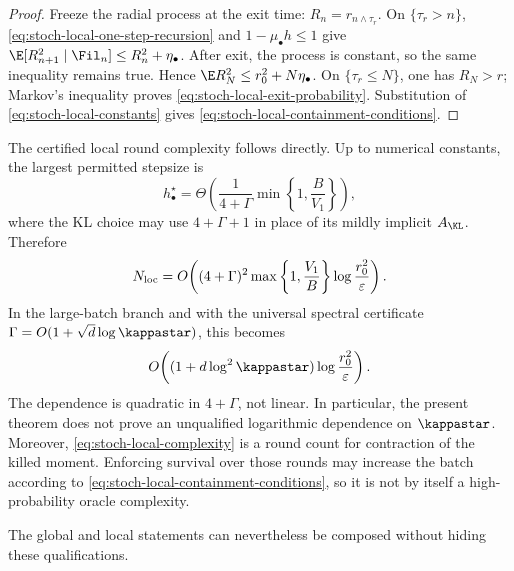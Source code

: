 \begin{proof}
Freeze the radial process at the exit time:
\(R_n=r_{n\wedge\tau_r}\).  On \(\{\tau_r>n\}\),
\eqref{eq:stoch-local-one-step-recursion} and
\(1-\mu_\bullet h\leq1\) give
\(\E[R_{n+1}^2\mid\Fil_n]\leq R_n^2+\eta_\bullet\).  After exit, the
process is constant, so the same inequality remains true.  Hence
\(\E R_N^2\leq r_0^2+N\eta_\bullet\).  On
\(\{\tau_r\leq N\}\), one has \(R_N>r\); Markov's inequality proves
\eqref{eq:stoch-local-exit-probability}.  Substitution of
\eqref{eq:stoch-local-constants} gives
\eqref{eq:stoch-local-containment-conditions}.
\end{proof}

The certified local round complexity follows directly.  Up to numerical
constants, the largest permitted stepsize is
\[
  h_\bullet^\star
  =\Theta\!\left(
    \frac1{4+\Gamma}\min\left\{1,\frac B{V_1}\right\}
  \right),
\]
where the KL choice may use \(4+\Gamma+1\) in place of its mildly implicit
\(A_{\KL}\).  Therefore
\begin{equation}
  N_{\rm loc}
  =O\!\left(
    (4+\Gamma)^2
    \max\left\{1,\frac{V_1}{B}\right\}
    \log\frac{r_0^2}{\varepsilon}
  \right).
  \label{eq:stoch-local-complexity}
\end{equation}
In the large-batch branch and with the universal spectral certificate
\(\Gamma=O(1+\sqrt d\log\kappastar)\), this becomes
\[
  O\!\left((1+d\log^2\kappastar)
  \log\frac{r_0^2}{\varepsilon}\right).
\]
The dependence is quadratic in \(4+\Gamma\), not linear.  In particular,
the present theorem does not prove an unqualified logarithmic dependence on
\(\kappastar\).  Moreover, \eqref{eq:stoch-local-complexity} is a round
count for contraction of the killed moment.  Enforcing survival over those
rounds may increase the batch according to
\eqref{eq:stoch-local-containment-conditions}, so it is not by itself a
high-probability oracle complexity.

The global and local statements can nevertheless be composed without
hiding these qualifications.

